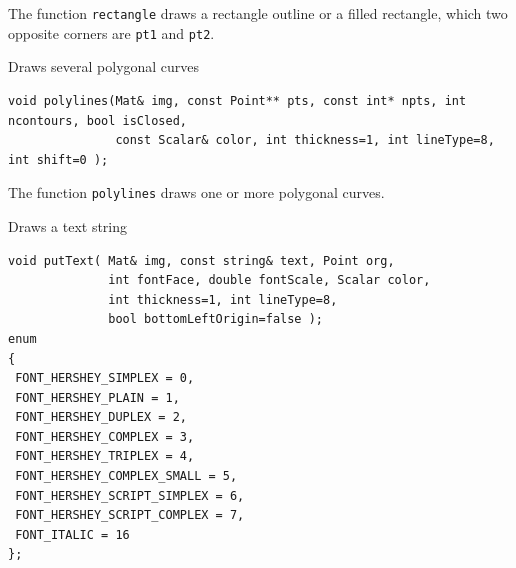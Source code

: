 The function \texttt{rectangle} draws a rectangle outline or a filled rectangle, which two opposite corners are \texttt{pt1} and \texttt{pt2}.
               

\label{polylines}
Draws several polygonal curves

\begin{lstlisting}
void polylines(Mat& img, const Point** pts, const int* npts, int ncontours, bool isClosed,
               const Scalar& color, int thickness=1, int lineType=8, int shift=0 );
\end{lstlisting}
\begin{description}
\end{description}

The function \texttt{polylines} draws one or more polygonal curves.

\label{putText}
Draws a text string

\begin{lstlisting}
void putText( Mat& img, const string& text, Point org,
              int fontFace, double fontScale, Scalar color,
              int thickness=1, int lineType=8,
              bool bottomLeftOrigin=false );
enum
{
 FONT_HERSHEY_SIMPLEX = 0,
 FONT_HERSHEY_PLAIN = 1,
 FONT_HERSHEY_DUPLEX = 2,
 FONT_HERSHEY_COMPLEX = 3,
 FONT_HERSHEY_TRIPLEX = 4,
 FONT_HERSHEY_COMPLEX_SMALL = 5,
 FONT_HERSHEY_SCRIPT_SIMPLEX = 6,
 FONT_HERSHEY_SCRIPT_COMPLEX = 7,
 FONT_ITALIC = 16
};
\end{lstlisting}
\begin{description}
\end{description}

